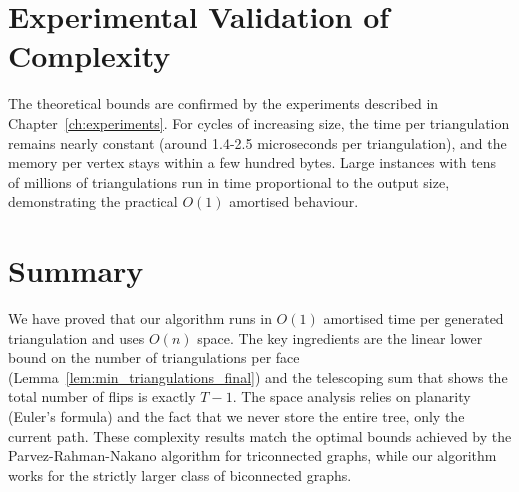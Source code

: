 \section{Experimental Validation of Complexity}
\label{sec:complexity_experimental}

The theoretical bounds are confirmed by the experiments described in Chapter~\ref{ch:experiments}. 
For cycles of increasing size, the time per triangulation remains nearly constant (around 1.4-2.5 microseconds per triangulation), and the memory per vertex stays within a few hundred bytes. 
Large instances with tens of millions of triangulations run in time proportional to the output size, demonstrating the practical \(O(1)\) amortised behaviour.

\section{Summary}
\label{sec:complexity_summary_end}

We have proved that our algorithm runs in \(O(1)\) amortised time per generated triangulation and uses \(O(n)\) space. 
The key ingredients are the linear lower bound on the number of triangulations per face (Lemma~\ref{lem:min_triangulations_final}) and the telescoping sum that shows the total number of flips is exactly \(T-1\). 
The space analysis relies on planarity (Euler’s formula) and the fact that we never store the entire tree, only the current path. 
These complexity results match the optimal bounds achieved by the Parvez-Rahman-Nakano algorithm for triconnected graphs, while our algorithm works for the strictly larger class of biconnected graphs.